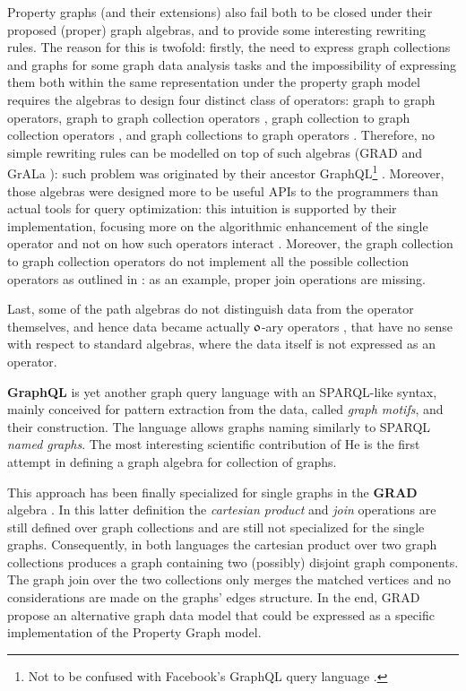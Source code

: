 Property graphs (and their extensions) also fail both to be closed under their proposed (proper) graph algebras, and to provide some interesting rewriting rules. The reason for this is twofold: firstly, the need to express graph collections and graphs for some graph data analysis tasks \cite{apacheflink} and the impossibility of expressing them both within the same representation under the property graph model requires the algebras to design four distinct class of operators: graph to graph operators, graph to graph collection operators \cite{JunghannsKAPR17}, graph collection to graph collection operators \cite{He2007}, and graph collections to graph operators \cite{apacheflink}. Therefore, no simple rewriting rules can be modelled on top of such algebras (GRAD \cite{GRAD,Ghrab2015} and GrALa \cite{apacheflink}): such problem was originated by  their ancestor GraphQL\footnote{Not to be confused with Facebook's GraphQL query language \cite{FGraphQL}.} \cite{He2007}. Moreover, those algebras were designed more to be useful APIs to the programmers than actual tools for query optimization: this intuition is supported by their implementation, focusing more on the algorithmic enhancement of the single operator and not on how such operators interact \cite{JunghannsPR17}. Moreover, the graph collection to graph collection operators do not implement all the possible collection operators as outlined in \cite{magnani04}: as an example, proper join operations are missing.

Last, some of the path algebras do not distinguish data from the operator themselves, and hence data became actually $\mathfrak{0}$-ary operators \cite{Neo4jAlg,MartonSV17,ThakkarPAV17}, that have no sense with respect to standard algebras, where the data itself is not expressed as an operator.

\textbf{GraphQL} \cite{He2007} is yet another graph query language with an SPARQL-like syntax, mainly conceived
for pattern extraction from the data, called \textit{graph motifs}, and their construction. The language
allows graphs naming similarly to SPARQL \textit{named graphs}. The most interesting scientific contribution
of He \cite{He2007} is the first attempt in defining a graph algebra for collection of graphs.

This approach has been finally specialized for single graphs in the \textbf{GRAD} algebra \cite{GRAD,Ghrab2015}. In this
latter definition the \textit{cartesian product} and \textit{join} operations are still defined over
graph collections and are still not specialized for the single graphs. Consequently, in both languages
the cartesian product over two graph collections produces a graph containing two (possibly) disjoint graph
components. The graph join over the two collections only merges the matched vertices and no considerations
are made on the graphs' edges structure. In the end, GRAD propose an alternative
graph data model that could be expressed as a specific implementation of the Property Graph model.


